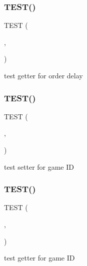 \subsubsection{\texorpdfstring{T\+E\+S\+T()}{TEST()}\hspace{0.1cm}{\footnotesize\ttfamily [4/54]}}
{\footnotesize\ttfamily T\+E\+ST (\begin{DoxyParamCaption}\item[{game\+Test}]{,  }\item[{get\+Order\+Delay\+Test}]{ }\end{DoxyParamCaption})}

test getter for order delay \mbox{\label{group__group2_ga5b9c78732584c0b347325a95615b6937}} 
\subsubsection{\texorpdfstring{T\+E\+S\+T()}{TEST()}\hspace{0.1cm}{\footnotesize\ttfamily [5/54]}}
{\footnotesize\ttfamily T\+E\+ST (\begin{DoxyParamCaption}\item[{game\+Test}]{,  }\item[{set\+G\+Id\+Test}]{ }\end{DoxyParamCaption})}

test setter for game ID \mbox{\label{group__group2_ga59eeec16be081e481b1407bfeb668cca}} 
\subsubsection{\texorpdfstring{T\+E\+S\+T()}{TEST()}\hspace{0.1cm}{\footnotesize\ttfamily [6/54]}}
{\footnotesize\ttfamily T\+E\+ST (\begin{DoxyParamCaption}\item[{game\+Test}]{,  }\item[{get\+G\+Id\+Test}]{ }\end{DoxyParamCaption})}

test getter for game ID \mbox{\label{group__group2_ga2a20e394bb2b9dd0bc40aacb575cf496}} 
